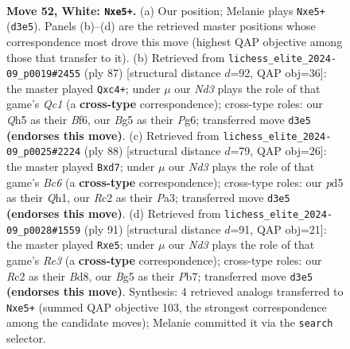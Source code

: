 \documentclass[11pt]{article}
\begin{document}
\clearpage

\begin{figure}[p]\centering
\begin{subfigure}{0.46\textwidth}\centering
\resizebox{\linewidth}{!}{%
\newchessgame
\chessboard[
  setfen={1qb5/r2k4/4p3/p2pnpBQ/P6P/3N4/2R5/RN4K1 w - - 0 52},
  showmover=false,
  pgfstyle=straightmove, color=movearrow, markmove={d3-e5}
]}
\caption{}
\end{subfigure}\hfill
\begin{subfigure}{0.46\textwidth}\centering
\resizebox{\linewidth}{!}{%
\newchessgame
\chessboard[
  setfen={2q3k1/5p2/3p1bp1/P2P4/2Q5/r3P3/2R1KP2/1R6 b - - 0 44},
  showmover=false,
  pgfstyle=straightmove, color=movearrow, markmove={c8-c4}
]}
\caption{}
\end{subfigure}
\\[4pt]
\begin{subfigure}{0.46\textwidth}\centering
\resizebox{\linewidth}{!}{%
\newchessgame
\chessboard[
  setfen={1k3r2/qNbb4/p1Bp4/1p2p3/8/PPR5/K1P5/7Q w - - 5 45},
  showmover=false,
  pgfstyle=straightmove, color=movearrow, markmove={c6-d7}
]}
\caption{}
\end{subfigure}\hfill
\begin{subfigure}{0.46\textwidth}\centering
\resizebox{\linewidth}{!}{%
\newchessgame
\chessboard[
  setfen={3bq3/1p5k/3Pr2p/2P1BRp1/4P3/6P1/Q5KP/8 b - - 0 46},
  showmover=false,
  pgfstyle=straightmove, color=movearrow, markmove={e6-e5}
]}
\caption{}
\end{subfigure}
\caption{\textbf{Move 52, White: \texttt{Nxe5+}.} (a) Our position; Melanie plays \texttt{Nxe5+} (\texttt{d3e5}). Panels (b)--(d) are the retrieved master positions whose correspondence most drove this move (highest QAP objective among those that transfer to it). (b) Retrieved from \texttt{lichess\_elite\_2024-09\_p0019\#2455} (ply 87) [structural distance $d$=92, QAP obj=36]: the master played \texttt{Qxc4+}; under $\mu$ our \emph{Nd3} plays the role of that game's \emph{Qc1} (a \textbf{cross-type} correspondence); cross-type roles: our \emph{Q}h5 as their \emph{B}f6, our \emph{B}g5 as their \emph{P}g6; transferred move \texttt{d3e5} \textbf{(endorses this move)}. (c) Retrieved from \texttt{lichess\_elite\_2024-09\_p0025\#2224} (ply 88) [structural distance $d$=79, QAP obj=26]: the master played \texttt{Bxd7}; under $\mu$ our \emph{Nd3} plays the role of that game's \emph{Bc6} (a \textbf{cross-type} correspondence); cross-type roles: our \emph{p}d5 as their \emph{Q}h1, our \emph{R}c2 as their \emph{P}a3; transferred move \texttt{d3e5} \textbf{(endorses this move)}. (d) Retrieved from \texttt{lichess\_elite\_2024-09\_p0028\#1559} (ply 91) [structural distance $d$=91, QAP obj=21]: the master played \texttt{Rxe5}; under $\mu$ our \emph{Nd3} plays the role of that game's \emph{Re3} (a \textbf{cross-type} correspondence); cross-type roles: our \emph{R}c2 as their \emph{B}d8, our \emph{B}g5 as their \emph{P}b7; transferred move \texttt{d3e5} \textbf{(endorses this move)}. Synthesis: 4 retrieved analogs transferred to \texttt{Nxe5+} (summed QAP objective 103, the strongest correspondence among the candidate moves); Melanie committed it via the \texttt{search} selector.}
\label{fig:thought-m102}
\end{figure}
\end{document}
